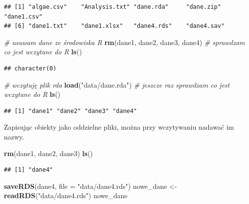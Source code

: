 \documentclass[
]{book}
\newenvironment{Shaded}{\begin{snugshade}}{\end{snugshade}}
\newcommand{\AttributeTok}[1]{\textcolor[rgb]{0.13,0.29,0.53}{#1}}
\newcommand{\CommentTok}[1]{\textcolor[rgb]{0.56,0.35,0.01}{\textit{#1}}}
\newcommand{\FunctionTok}[1]{\textcolor[rgb]{0.13,0.29,0.53}{\textbf{#1}}}
\newcommand{\NormalTok}[1]{#1}
\newcommand{\OtherTok}[1]{\textcolor[rgb]{0.56,0.35,0.01}{#1}}
\newcommand{\StringTok}[1]{\textcolor[rgb]{0.31,0.60,0.02}{#1}}
\theoremstyle{plain}
\theoremstyle{definition}
\theoremstyle{definition}
\theoremstyle{definition}
\theoremstyle{definition}
\theoremstyle{definition}
\theoremstyle{remark}
\begin{document}
\begin{verbatim}
## [1] "algae.csv"    "Analysis.txt" "dane.rda"     "dane.zip"     "dane1.csv"   
## [6] "dane1.txt"    "dane1.xlsx"   "dane4.rds"    "dane4.sav"
\end{verbatim}

\begin{Shaded}
\begin{Highlighting}[]
\CommentTok{\# usuwam dane ze środowiska R}
\FunctionTok{rm}\NormalTok{(dane1, dane2, dane3, dane4)}
\CommentTok{\# sprawdzam co jest wczytane do R}
\FunctionTok{ls}\NormalTok{()}
\end{Highlighting}
\end{Shaded}

\begin{verbatim}
## character(0)
\end{verbatim}

\begin{Shaded}
\begin{Highlighting}[]
\CommentTok{\# wczytuję plik rda}
\FunctionTok{load}\NormalTok{(}\StringTok{"data/dane.rda"}\NormalTok{)}
\CommentTok{\# jeszcze raz sprawdzam co jest wczytane do R}
\FunctionTok{ls}\NormalTok{()}
\end{Highlighting}
\end{Shaded}

\begin{verbatim}
## [1] "dane1" "dane2" "dane3" "dane4"
\end{verbatim}

Zapisując obiekty jako oddzielne pliki, można przy wczytywaniu nadawać im nazwy.

\begin{Shaded}
\begin{Highlighting}[]
\FunctionTok{rm}\NormalTok{(dane1, dane2, dane3)}
\FunctionTok{ls}\NormalTok{()}
\end{Highlighting}
\end{Shaded}

\begin{verbatim}
## [1] "dane4"
\end{verbatim}

\begin{Shaded}
\begin{Highlighting}[]
\FunctionTok{saveRDS}\NormalTok{(dane4, }\AttributeTok{file =} \StringTok{"data/dane4.rds"}\NormalTok{)}
\NormalTok{nowe\_dane }\OtherTok{\textless{}{-}} \FunctionTok{readRDS}\NormalTok{(}\StringTok{"data/dane4.rds"}\NormalTok{)}
\NormalTok{nowe\_dane}
\end{Highlighting}
\end{Shaded}
\end{document}

